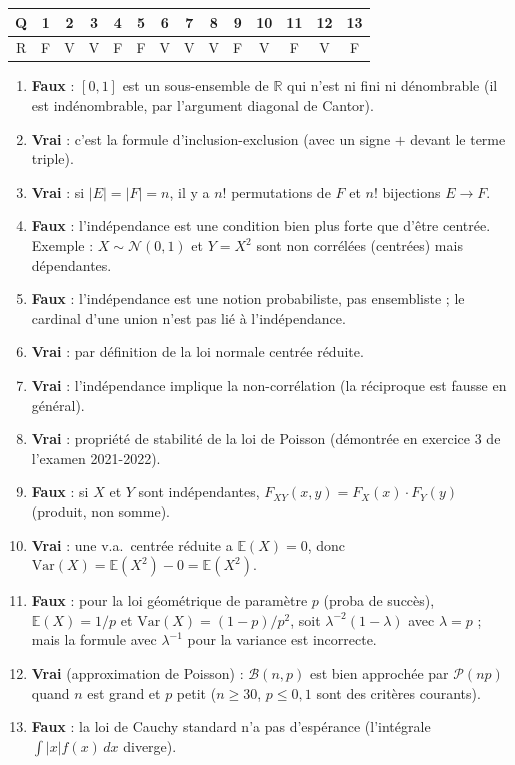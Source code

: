 \documentclass[12pt,a4paper]{article}
\begin{document}
\begin{boitecorrige}
\begin{center}
\begin{tabular}{|c|c|c|c|c|c|c|c|c|c|c|c|c|c|}
\hline
Q & 1 & 2 & 3 & 4 & 5 & 6 & 7 & 8 & 9 & 10 & 11 & 12 & 13 \\
\hline
R & F & V & V & F & F & V & V & V & F & V & F & V & F \\
\hline
\end{tabular}
\end{center}

\begin{enumerate}
  \item \textbf{Faux} : $[0,1]$ est un sous-ensemble de $\mathbb{R}$ qui n'est ni fini ni dénombrable (il est indénombrable, par l'argument diagonal de Cantor).
  \item \textbf{Vrai} : c'est la formule d'inclusion-exclusion (avec un signe $+$ devant le terme triple).
  \item \textbf{Vrai} : si $|E|=|F|=n$, il y a $n!$ permutations de $F$ et $n!$ bijections $E\to F$.
  \item \textbf{Faux} : l'indépendance est une condition bien plus forte que d'être centrée. Exemple : $X\sim\mathcal{N}(0,1)$ et $Y=X^2$ sont non corrélées (centrées) mais dépendantes.
  \item \textbf{Faux} : l'indépendance est une notion probabiliste, pas ensembliste ; le cardinal d'une union n'est pas lié à l'indépendance.
  \item \textbf{Vrai} : par définition de la loi normale centrée réduite.
  \item \textbf{Vrai} : l'indépendance implique la non-corrélation (la réciproque est fausse en général).
  \item \textbf{Vrai} : propriété de stabilité de la loi de Poisson (démontrée en exercice 3 de l'examen 2021-2022).
  \item \textbf{Faux} : si $X$ et $Y$ sont indépendantes, $F_{XY}(x,y)=F_X(x)\cdot F_Y(y)$ (produit, non somme).
  \item \textbf{Vrai} : une v.a.\ centrée réduite a $\mathbb{E}(X)=0$, donc $\mathrm{Var}(X)=\mathbb{E}(X^2)-0=\mathbb{E}(X^2)$.
  \item \textbf{Faux} : pour la loi géométrique de paramètre $p$ (proba de succès), $\mathbb{E}(X)=1/p$ et $\mathrm{Var}(X)=(1-p)/p^2$, soit $\lambda^{-2}(1-\lambda)$ avec $\lambda=p$ ; mais la formule avec $\lambda^{-1}$ pour la variance est incorrecte.
  \item \textbf{Vrai} (approximation de Poisson) : $\mathcal{B}(n,p)$ est bien approchée par $\mathcal{P}(np)$ quand $n$ est grand et $p$ petit ($n\geq 30$, $p\leq 0{,}1$ sont des critères courants).
  \item \textbf{Faux} : la loi de Cauchy standard n'a pas d'espérance (l'intégrale $\int |x|f(x)\,dx$ diverge).
\end{enumerate}
\end{boitecorrige}

\ifdefined\inMainDoc\else
\end{document}
